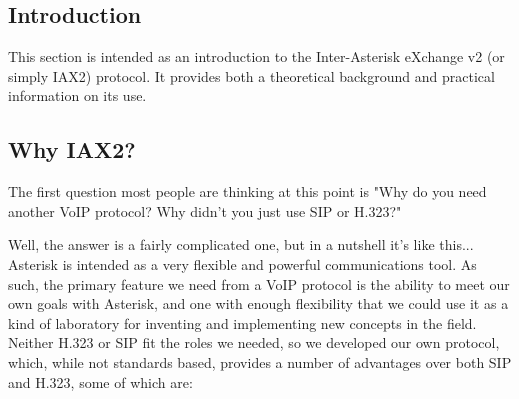 \subsection{Introduction}

This section is intended as an introduction to the Inter-Asterisk 
eXchange v2 (or simply IAX2) protocol.  It provides both a theoretical 
background and practical information on its use.

\subsection{Why IAX2?}

The first question most people are thinking at this point is "Why do you 
need another VoIP protocol?  Why didn't you just use SIP or H.323?"

Well, the answer is a fairly complicated one, but in a nutshell it's like
this...  Asterisk is intended as a very flexible and powerful
communications tool.  As such, the primary feature we need from a VoIP
protocol is the ability to meet our own goals with Asterisk, and one with
enough flexibility that we could use it as a kind of laboratory for
inventing and implementing new concepts in the field.  Neither H.323 or
SIP fit the roles we needed, so we developed our own protocol, which,
while not standards based, provides a number of advantages over both SIP
and H.323, some of which are:

